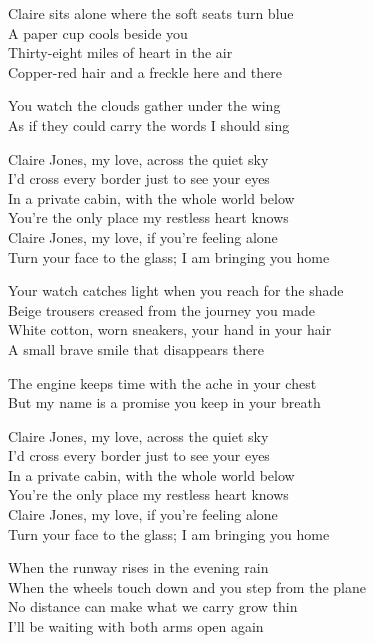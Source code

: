 \begin{lyrics}
Claire sits alone where the soft seats turn blue\\
A paper cup cools beside you\\
Thirty-eight miles of heart in the air\\
Copper-red hair and a freckle here and there

You watch the clouds gather under the wing\\
As if they could carry the words I should sing

Claire Jones, my love, across the quiet sky\\
I’d cross every border just to see your eyes\\
In a private cabin, with the whole world below\\
You’re the only place my restless heart knows\\
Claire Jones, my love, if you’re feeling alone\\
Turn your face to the glass; I am bringing you home

Your watch catches light when you reach for the shade\\
Beige trousers creased from the journey you made\\
White cotton, worn sneakers, your hand in your hair\\
A small brave smile that disappears there

The engine keeps time with the ache in your chest\\
But my name is a promise you keep in your breath

Claire Jones, my love, across the quiet sky\\
I’d cross every border just to see your eyes\\
In a private cabin, with the whole world below\\
You’re the only place my restless heart knows\\
Claire Jones, my love, if you’re feeling alone\\
Turn your face to the glass; I am bringing you home

When the runway rises in the evening rain\\
When the wheels touch down and you step from the plane\\
No distance can make what we carry grow thin\\
I’ll be waiting with both arms open again


\end{lyrics}
